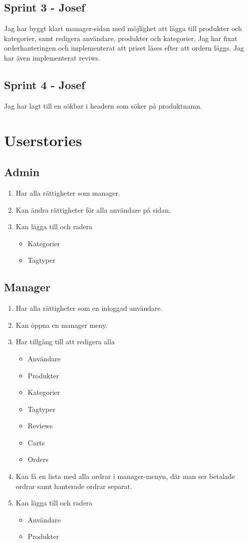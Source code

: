 \documentclass[a4paper]{article}
\begin{document}
\subsection{Sprint 3 - Josef}
Jag har byggt klart manager-sidan med möjlighet att lägga till produkter och kategorier, samt redigera användare, produkter och kategorier. Jag har fixat orderhanteringen och implementerat att priset låses efter att ordern läggs. Jag har även implementerat reviws. 

\subsection{Sprint 4 - Josef}
Jag har lagt till en sökbar i headern som söker på produktnamn.

\newpage
\section{Userstories}
\subsection{Admin}
\begin{enumerate}
  \item Har alla rättigheter som manager.
  \item Kan ändra rättigheter för alla användare på sidan.
  \item Kan lägga till och radera
  \begin{itemize}
    \item Kategorier
    \item Tagtyper
  \end{itemize}
\end{enumerate}
%
\subsection{Manager}
\begin{enumerate}
  \item Har alla rättigheter som en inloggad användare.
  \item Kan öppna en manager meny.
  \item Har tillgång till att redigera alla
  \begin{itemize}
    \item Användare
    \item Produkter
    \item Kategorier 
    \item Tagtyper
    \item Reviews
    \item Carts
    \item Orders
  \end{itemize}
  \item Kan få en lista med alla ordrar i manager-menyn, där man ser betalade ordrar samt hanterade ordrar separat.
  \item Kan lägga till och radera
  \begin{itemize}
  \item Användare
  \item Produkter
  \end{itemize}
\end{enumerate}
%
\end{document}
